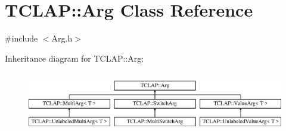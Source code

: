 \hypertarget{class_t_c_l_a_p_1_1_arg}{}\section{T\+C\+L\+A\+P\+:\+:Arg Class Reference}
\label{class_t_c_l_a_p_1_1_arg}


{\ttfamily \#include $<$Arg.\+h$>$}

Inheritance diagram for T\+C\+L\+A\+P\+:\+:Arg\+:\begin{figure}[H]
\begin{center}
\leavevmode
\includegraphics[height=2.705314cm]{class_t_c_l_a_p_1_1_arg}
\end{center}
\end{figure}
